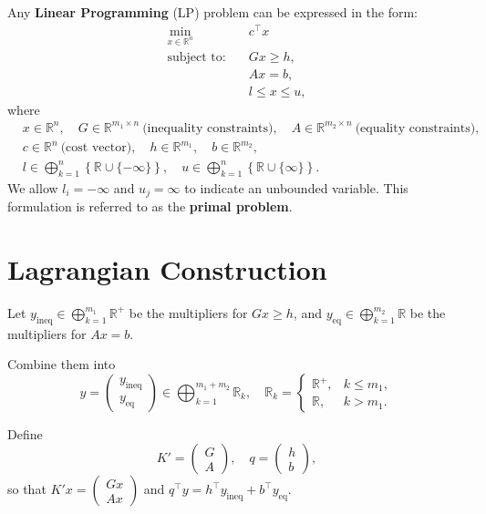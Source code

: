 \documentclass[twoside,12pt,openright]{report}  %
\begin{document}
Any \textbf{Linear Programming} (LP) problem can be expressed in the form:
\[
\begin{aligned}
    \min_{x \in \mathbb{R}^n} \quad & c^\top x \\
    \text{subject to:} \quad & Gx \ge h, \\
    & Ax = b, \\
    & l \le x \le u,
\end{aligned}
\]
where 
\[
\begin{aligned}
&x \in \mathbb{R}^n, \quad 
G \in \mathbb{R}^{m_1 \times n} \ \text{(inequality constraints)}, \quad
A \in \mathbb{R}^{m_2 \times n} \ \text{(equality constraints)}, \\
&c \in \mathbb{R}^n \ \text{(cost vector)}, \quad
h \in \mathbb{R}^{m_1}, \quad b \in \mathbb{R}^{m_2}, \\
&l \in \bigoplus_{k=1}^{n} \left\{ \mathbb{R} \cup \{-\infty\} \right\}, \quad
u \in \bigoplus_{k=1}^{n} \left\{ \mathbb{R} \cup \{\infty\} \right\}.
\end{aligned}
\]
We allow $l_i = -\infty$ and $u_j = \infty$ to indicate an unbounded variable.  
This formulation is referred to as the \textbf{primal problem}.

\section{Lagrangian Construction}
Let $y_{\mathrm{ineq}} \in \bigoplus_{k=1}^{m_1} \mathbb{R}^+$ be the multipliers for $Gx \ge h$, and  
$y_{\mathrm{eq}} \in \bigoplus_{k=1}^{m_2} \mathbb{R}$ be the multipliers for $Ax = b$.  

Combine them into 
\[
y = \begin{pmatrix} y_{\mathrm{ineq}} \\ y_{\mathrm{eq}} \end{pmatrix} \in \bigoplus_{k=1}^{m_1+m_2} \mathbb{R}_k, 
\quad \mathbb{R}_k =
\begin{cases}
\mathbb{R}^+, & k \le m_1, \\
\mathbb{R}, & k > m_1.
\end{cases}
\]

Define
\[
K' = \begin{pmatrix} G \\ A \end{pmatrix}, 
\quad q = \begin{pmatrix} h \\ b \end{pmatrix},
\]
so that $K' x = \begin{pmatrix} Gx \\ Ax \end{pmatrix}$ and $q^\top y = h^\top y_{\mathrm{ineq}} + b^\top y_{\mathrm{eq}}$.
\end{document}
